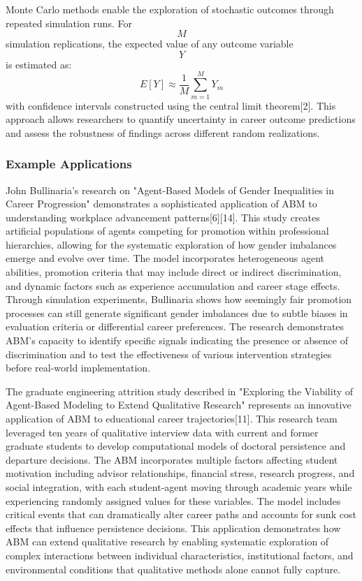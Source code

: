 \documentclass[main.tex]{subfiles}
\begin{document}
Monte Carlo methods enable the exploration of stochastic outcomes through repeated simulation runs. For $$ M $$ simulation replications, the expected value of any outcome variable $$ Y $$ is estimated as:
$$
E[Y] \approx \frac{1}{M} \sum_{m=1}^{M} Y_m
$$
with confidence intervals constructed using the central limit theorem[2]. This approach allows researchers to quantify uncertainty in career outcome predictions and assess the robustness of findings across different random realizations.

\subsubsection{Example Applications}

John Bullinaria's research on "Agent-Based Models of Gender Inequalities in Career Progression" demonstrates a sophisticated application of ABM to understanding workplace advancement patterns[6][14]. This study creates artificial populations of agents competing for promotion within professional hierarchies, allowing for the systematic exploration of how gender imbalances emerge and evolve over time. The model incorporates heterogeneous agent abilities, promotion criteria that may include direct or indirect discrimination, and dynamic factors such as experience accumulation and career stage effects. Through simulation experiments, Bullinaria shows how seemingly fair promotion processes can still generate significant gender imbalances due to subtle biases in evaluation criteria or differential career preferences. The research demonstrates ABM's capacity to identify specific signals indicating the presence or absence of discrimination and to test the effectiveness of various intervention strategies before real-world implementation.

The graduate engineering attrition study described in "Exploring the Viability of Agent-Based Modeling to Extend Qualitative Research" represents an innovative application of ABM to educational career trajectories[11]. This research team leveraged ten years of qualitative interview data with current and former graduate students to develop computational models of doctoral persistence and departure decisions. The ABM incorporates multiple factors affecting student motivation including advisor relationships, financial stress, research progress, and social integration, with each student-agent moving through academic years while experiencing randomly assigned values for these variables. The model includes critical events that can dramatically alter career paths and accounts for sunk cost effects that influence persistence decisions. This application demonstrates how ABM can extend qualitative research by enabling systematic exploration of complex interactions between individual characteristics, institutional factors, and environmental conditions that qualitative methods alone cannot fully capture.
\end{document}
